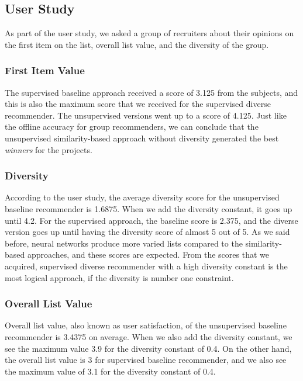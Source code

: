 \subsection{User Study}

As part of the user study, we asked a group of recruiters about their opinions on the first item on the list, overall list value, and the diversity of the group.

\subsubsection{First Item Value}

The supervised baseline approach received a score of 3.125 from the subjects, and this is also the maximum score that we received for the supervised diverse recommender. The unsupervised versions went up to a score of 4.125. Just like the offline accuracy for group recommenders, we can conclude that the unsupervised similarity-based approach without diversity generated the best \textit{winners} for the projects.

\subsubsection{Diversity}

According to the user study, the average diversity score for the unsupervised baseline recommender is 1.6875. When we add the diversity constant, it goes up until 4.2. For the supervised approach, the baseline score is 2.375, and the diverse version goes up until having the diversity score of almost 5 out of 5. As we said before, neural networks produce more varied lists compared to the similarity-based approaches, and these scores are expected. From the scores that we acquired, supervised diverse recommender with a high diversity constant is the most logical approach, if the diversity is number one constraint. 

\subsubsection{Overall List Value}\label{discuss-group-satisfaction}

Overall list value, also known as user satisfaction, of the unsupervised baseline recommender is 3.4375 on average. When we also add the diversity constant, we see the maximum value 3.9 for the diversity constant of 0.4. On the other hand, the overall list value is 3 for supervised baseline recommender, and we also see the maximum value of 3.1 for the diversity constant of 0.4.

